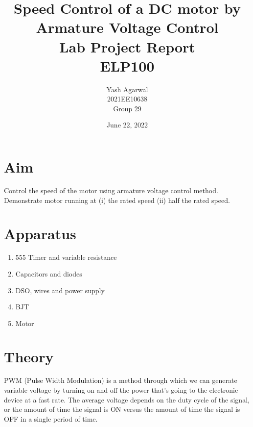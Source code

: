 \documentclass{article}
\title{Speed Control of a DC motor by Armature Voltage Control \\ Lab Project Report \\ ELP100}
\author{Yash Agarwal \\ 2021EE10638 \\ Group 29}
\date{June 22, 2022}
\begin{document}
\pagecolor{yellow!15}
\maketitle
\vspace{15px}
\tableofcontents
{}
\newpage
\section{Aim}
Control the speed of the motor using armature voltage control method. Demonstrate motor running at (i) the rated speed (ii) half the rated speed.

\section{Apparatus}
\begin{enumerate}
\item 555 Timer and variable resistance
\item Capacitors and diodes
\item DSO, wires and power supply
\item BJT
\item Motor

\end{enumerate}

\section{Theory}
\begin{figure}
\end{figure}

PWM (Pulse Width Modulation) is a method through which we can generate variable voltage by turning on and off the power that’s going to the electronic device at a fast rate. The average voltage depends on the duty cycle of the signal, or the amount of time the signal is ON versus the amount of time the signal is OFF in a single period of time.
\end{document}
